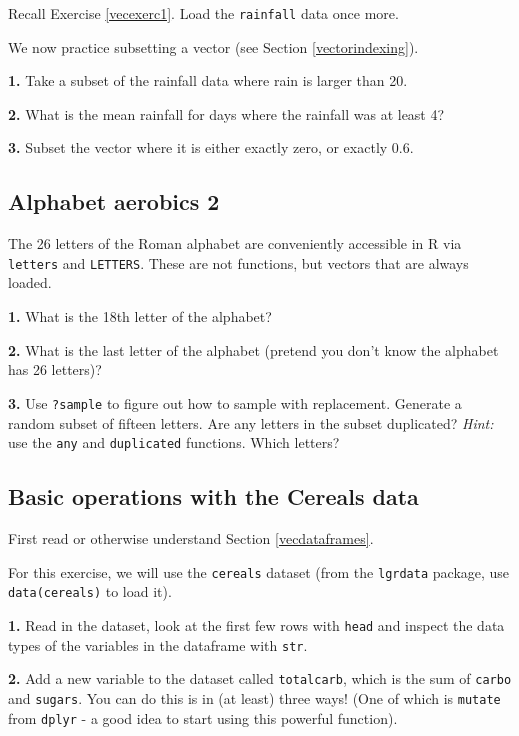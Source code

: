 \documentclass[]{book}
\begin{document}
Recall Exercise \ref{vecexerc1}. Load the \texttt{rainfall} data once more.

We now practice subsetting a vector (see Section \ref{vectorindexing}).

\textbf{1.} Take a subset of the rainfall data where rain is larger than 20.

\textbf{2.} What is the mean rainfall for days where the rainfall was at least 4?

\textbf{3.} Subset the vector where it is either exactly zero, or exactly 0.6.

\hypertarget{alphabet-aerobics-2}{%
\subsection{Alphabet aerobics 2}\label{alphabet-aerobics-2}}

The 26 letters of the Roman alphabet are conveniently accessible in R via \texttt{letters} and \texttt{LETTERS}. These are not functions, but vectors that are always loaded.

\textbf{1.} What is the 18th letter of the alphabet?

\textbf{2.} What is the last letter of the alphabet (pretend you don't know the alphabet has 26 letters)?

\textbf{3.} Use \texttt{?sample} to figure out how to sample with replacement. Generate a random subset of fifteen letters. Are any letters in the subset duplicated? \emph{Hint:} use the \texttt{any} and \texttt{duplicated} functions. Which letters?

\hypertarget{basic-operations-with-the-cereals-data}{%
\subsection{Basic operations with the Cereals data}\label{basic-operations-with-the-cereals-data}}

First read or otherwise understand Section \ref{vecdataframes}.

For this exercise, we will use the \texttt{cereals} dataset (from the \texttt{lgrdata} package, use \texttt{data(cereals)} to load it).

\textbf{1.} Read in the dataset, look at the first few rows with \texttt{head} and inspect the data types of the variables in the dataframe with \texttt{str}.

\textbf{2.} Add a new variable to the dataset called \texttt{totalcarb}, which is the sum of \texttt{carbo} and \texttt{sugars}. You can do this is in (at least) three ways! (One of which is \texttt{mutate} from \texttt{dplyr} - a good idea to start using this powerful function).
\end{document}
